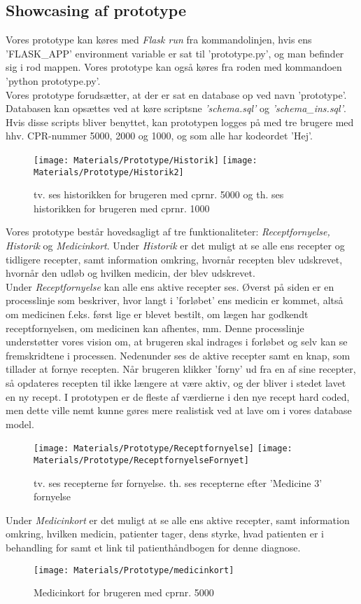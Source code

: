\newpage
\subsection{Showcasing af prototype}
Vores prototype kan køres med \textit{Flask run} fra kommandolinjen, hvis ens 'FLASK\_APP' environment variable er sat til 'prototype.py', og man befinder sig i rod mappen. Vores prototype kan også køres fra roden med kommandoen 'python prototype.py'.\\
Vores prototype forudsætter, at der er sat en database op ved navn 'prototype'. Databasen kan opsættes ved at køre scriptsne \textit{'schema.sql'} og \textit{'schema\_ins.sql'}. Hvis disse scripts bliver benyttet, kan prototypen logges på med tre brugere med hhv. CPR-nummer 5000, 2000 og 1000, og som alle har kodeordet 'Hej'.

\begin{figure}[h!]
	\texttt{[image: Materials/Prototype/Historik]}
	\texttt{[image: Materials/Prototype/Historik2]}
	\caption{tv. ses historikken for brugeren med cprnr. 5000 og th. ses historikken for brugeren med cprnr. 1000}
\end{figure}

Vores prototype består hovedsagligt af tre funktionaliteter: \textit{Receptfornyelse, Historik} og \textit{Medicinkort}. Under \textit{Historik} er det muligt at se alle ens recepter og tidligere recepter, samt information omkring, hvornår recepten blev udskrevet, hvornår den udløb og hvilken medicin, der blev udskrevet.\\
Under \textit{Receptfornyelse} kan alle ens aktive recepter ses. Øverst på siden er en processlinje som beskriver, hvor langt i 'forløbet' ens medicin er kommet, altså om medicinen f.eks. først lige er blevet bestilt, om lægen har godkendt receptfornyelsen, om medicinen kan afhentes, mm. Denne processlinje understøtter vores vision om, at brugeren skal indrages i forløbet og selv kan se fremskridtene i processen. Nedenunder ses de aktive recepter samt en knap, som tillader at fornye recepten. Når brugeren klikker 'forny' ud fra en af sine recepter, så opdateres recepten til ikke længere at være aktiv, og der bliver i stedet lavet en ny recept. I prototypen er de fleste af værdierne i den nye recept hard coded, men dette ville nemt kunne gøres mere realistisk ved at lave om i vores database model.
\begin{figure}[h!]
	\texttt{[image: Materials/Prototype/Receptfornyelse]}
	\texttt{[image: Materials/Prototype/ReceptfornyelseFornyet]}
	\caption{tv. ses recepterne før fornyelse. th. ses recepterne efter 'Medicine 3' fornyelse}
\end{figure}
\newpage
Under \textit{Medicinkort} er det muligt at se alle ens aktive recepter, samt information omkring, hvilken medicin, patienter tager, dens styrke, hvad patienten er i behandling for samt et link til patienthåndbogen for denne diagnose.
\begin{figure}[h!]
	\texttt{[image: Materials/Prototype/medicinkort]}
	\caption{Medicinkort for brugeren med cprnr. 5000}
\end{figure}
